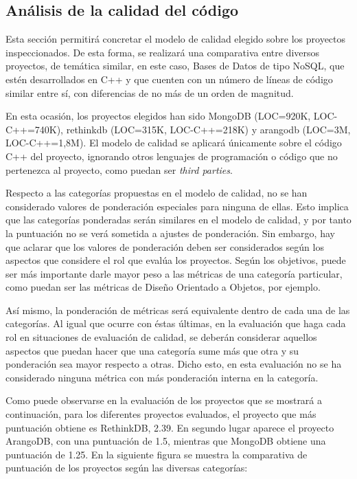\documentclass[11pt]{article}
\begin{document}
\subsection{Análisis de la calidad del código}

Esta sección permitirá concretar el modelo de calidad elegido sobre los proyectos inspeccionados. De esta forma, se realizará una comparativa entre diversos proyectos, de temática similar, en este caso, Bases de Datos de tipo NoSQL, que estén desarrollados en C++ y que cuenten con un número de líneas de código similar entre sí, con diferencias de no más de un orden de magnitud.

En esta ocasión, los proyectos elegidos han sido MongoDB (LOC=920K, LOC-C++=740K), rethinkdb (LOC=315K, LOC-C++=218K) y arangodb (LOC=3M, LOC-C++=1,8M). El modelo de calidad se aplicará únicamente sobre el código C++ del proyecto, ignorando otros lenguajes de programación o código que no pertenezca al proyecto, como puedan ser \emph{third parties}.

Respecto a las categorías propuestas en el modelo de calidad, no se han considerado valores de ponderación especiales para ninguna de ellas. Esto implica que las categorías ponderadas serán similares en el modelo de calidad, y por tanto la puntuación no se verá sometida a ajustes de ponderación. Sin embargo, hay que aclarar que los valores de ponderación deben ser considerados según los aspectos que considere el rol que evalúa los proyectos. Según los objetivos, puede ser más importante darle mayor peso a las métricas de una categoría particular, como puedan ser las métricas de Diseño Orientado a Objetos, por ejemplo. 

Así mismo, la ponderación de métricas será equivalente dentro de cada una de las categorías. Al igual que ocurre con éstas últimas, en la evaluación que haga cada rol en situaciones de evaluación de calidad, se deberán considerar aquellos aspectos que puedan hacer que una categoría sume más que otra y su ponderación sea mayor respecto a otras. Dicho esto, en esta evaluación no se ha considerado ninguna métrica con más ponderación interna en la categoría.

Como puede observarse en la evaluación de los proyectos que se mostrará a continuación, para los diferentes proyectos evaluados, el proyecto que más puntuación obtiene es RethinkDB, 2.39. En segundo lugar aparece el proyecto ArangoDB, con una puntuación de 1.5, mientras que MongoDB obtiene una puntuación de 1.25. En la siguiente figura se muestra la comparativa de puntuación de los proyectos según las diversas categorías:
\end{document}
